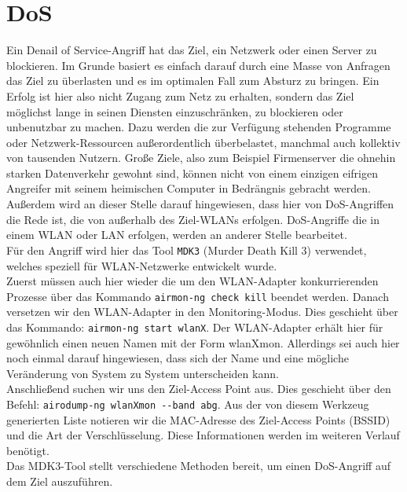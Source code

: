 \section{DoS}
Ein Denail of Service-Angriff hat das Ziel, ein Netzwerk oder einen Server zu blockieren. Im Grunde basiert es einfach darauf durch eine Masse von Anfragen das Ziel zu überlasten und es im optimalen Fall zum Absturz zu bringen. Ein Erfolg ist hier also nicht Zugang zum Netz zu erhalten, sondern das Ziel möglichst lange in seinen Diensten einzuschränken, zu blockieren oder unbenutzbar zu machen. Dazu werden die zur Verfügung stehenden Programme oder Netzwerk-Ressourcen außerordentlich überbelastet, manchmal auch kollektiv von tausenden Nutzern. Große Ziele, also zum Beispiel Firmenserver die ohnehin starken Datenverkehr gewohnt sind, können nicht von einem einzigen eifrigen Angreifer mit seinem heimischen Computer in Bedrängnis gebracht werden. Außerdem wird an dieser Stelle darauf hingewiesen, dass hier von DoS-Angriffen die Rede ist, die von außerhalb des Ziel-WLANs erfolgen. DoS-Angriffe die in einem WLAN oder LAN erfolgen, werden an anderer Stelle bearbeitet. \\
Für den Angriff wird hier das Tool \colorbox{altgray}{\lstinline|MDK3|} (Murder Death Kill 3) verwendet, welches speziell für WLAN-Netzwerke entwickelt wurde. \\
Zuerst müssen auch hier wieder die um den WLAN-Adapter konkurrierenden Prozesse über das Kommando
\colorbox{altgray}{\lstinline|airmon-ng check kill|}
beendet werden.
Danach versetzen wir den WLAN-Adapter in den Monitoring-Modus. Dies geschieht über das Kommando:
\colorbox{altgray}{\lstinline|airmon-ng start wlanX|}.
Der WLAN-Adapter erhält hier für gewöhnlich einen neuen Namen mit der Form wlanXmon. Allerdings sei auch hier noch einmal darauf hingewiesen, dass sich der Name und eine mögliche Veränderung von System zu System unterscheiden kann.
\\
Anschließend suchen wir uns den Ziel-Access Point aus. Dies geschieht über den Befehl:
\colorbox{altgray}{\lstinline|airodump-ng wlanXmon --band abg|}. Aus der von diesem Werkzeug generierten Liste notieren wir die MAC-Adresse des Ziel-Access Points (BSSID) und die Art der Verschlüsselung. Diese Informationen werden im weiteren Verlauf benötigt.
\\
Das MDK3-Tool stellt verschiedene Methoden bereit, um einen DoS-Angriff auf dem Ziel auszuführen.

